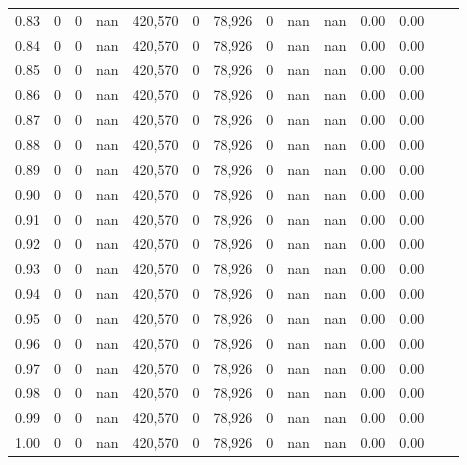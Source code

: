 \begin{tabular}{rrrrrrrrrrrrrr}
0.83 &       0 &       0 &     nan &  420,570 &        0 &  78,926 &       0 &   nan &   nan &  0.00 &      0.00 \\
0.84 &       0 &       0 &     nan &  420,570 &        0 &  78,926 &       0 &   nan &   nan &  0.00 &      0.00 \\
0.85 &       0 &       0 &     nan &  420,570 &        0 &  78,926 &       0 &   nan &   nan &  0.00 &      0.00 \\
0.86 &       0 &       0 &     nan &  420,570 &        0 &  78,926 &       0 &   nan &   nan &  0.00 &      0.00 \\
0.87 &       0 &       0 &     nan &  420,570 &        0 &  78,926 &       0 &   nan &   nan &  0.00 &      0.00 \\
0.88 &       0 &       0 &     nan &  420,570 &        0 &  78,926 &       0 &   nan &   nan &  0.00 &      0.00 \\
0.89 &       0 &       0 &     nan &  420,570 &        0 &  78,926 &       0 &   nan &   nan &  0.00 &      0.00 \\
0.90 &       0 &       0 &     nan &  420,570 &        0 &  78,926 &       0 &   nan &   nan &  0.00 &      0.00 \\
0.91 &       0 &       0 &     nan &  420,570 &        0 &  78,926 &       0 &   nan &   nan &  0.00 &      0.00 \\
0.92 &       0 &       0 &     nan &  420,570 &        0 &  78,926 &       0 &   nan &   nan &  0.00 &      0.00 \\
0.93 &       0 &       0 &     nan &  420,570 &        0 &  78,926 &       0 &   nan &   nan &  0.00 &      0.00 \\
0.94 &       0 &       0 &     nan &  420,570 &        0 &  78,926 &       0 &   nan &   nan &  0.00 &      0.00 \\
0.95 &       0 &       0 &     nan &  420,570 &        0 &  78,926 &       0 &   nan &   nan &  0.00 &      0.00 \\
0.96 &       0 &       0 &     nan &  420,570 &        0 &  78,926 &       0 &   nan &   nan &  0.00 &      0.00 \\
0.97 &       0 &       0 &     nan &  420,570 &        0 &  78,926 &       0 &   nan &   nan &  0.00 &      0.00 \\
0.98 &       0 &       0 &     nan &  420,570 &        0 &  78,926 &       0 &   nan &   nan &  0.00 &      0.00 \\
0.99 &       0 &       0 &     nan &  420,570 &        0 &  78,926 &       0 &   nan &   nan &  0.00 &      0.00 \\
1.00 &       0 &       0 &     nan &  420,570 &        0 &  78,926 &       0 &   nan &   nan &  0.00 &      0.00 \\
\bottomrule
\end{tabular}
